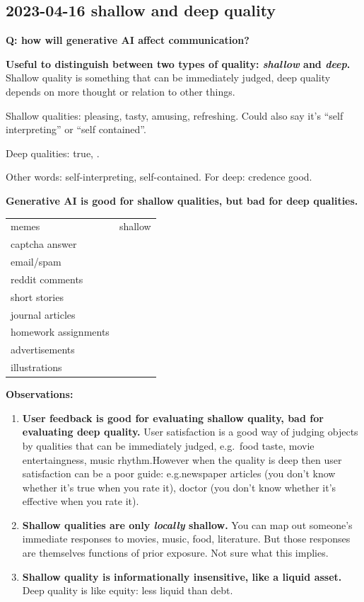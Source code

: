 \documentclass[
  11pt,
  letterpaper,
  DIV=11,
  numbers=noendperiod,
  oneside]{scrartcl}
\begin{document}
\hypertarget{shallow-and-deep-quality}{%
\subsection{2023-04-16 \textbar{} shallow and deep
quality}\label{shallow-and-deep-quality}}

\textbf{Q: how will generative AI affect communication?}

\textbf{Useful to distinguish between two types of quality:
\emph{shallow} and \emph{deep}.} Shallow quality is something that can
be immediately judged, deep quality depends on more thought or relation
to other things.

Shallow qualities: pleasing, tasty, amusing, refreshing. Could also say
it's ``self interpreting'' or ``self contained''.

Deep qualities: true, .

Other words: self-interpreting, self-contained. For deep: credence good.

\textbf{Generative AI is good for shallow qualities, but bad for deep
qualities.}

\begin{longtable}[]{@{}ll@{}}
\toprule\noalign{}
\endhead
\bottomrule\noalign{}
\endlastfoot
memes & shallow \\
captcha answer & \\
email/spam & \\
reddit comments & \\
short stories & \\
journal articles & \\
homework assignments & \\
advertisements & \\
illustrations & \\
\end{longtable}

\textbf{Observations:}

\begin{enumerate}
\def\labelenumi{\arabic{enumi}.}
\item
  \textbf{User feedback is good for evaluating shallow quality, bad for
  evaluating deep quality.} User satisfaction is a good way of judging
  objects by qualities that can be immediately judged, e.g.~food taste,
  movie entertaingness, music rhythm.However when the quality is deep
  then user satisfaction can be a poor guide: e.g.newspaper articles
  (you don't know whether it's true when you rate it), doctor (you don't
  know whether it's effective when you rate it).
\item
  \textbf{Shallow qualities are only \emph{locally} shallow.} You can
  map out someone's immediate responses to movies, music, food,
  literature. But those responses are themselves functions of prior
  exposure. Not sure what this implies.
\item
  \textbf{Shallow quality is informationally insensitive, like a liquid
  asset.} Deep quality is like equity: less liquid than debt.
\end{enumerate}
\end{document}
